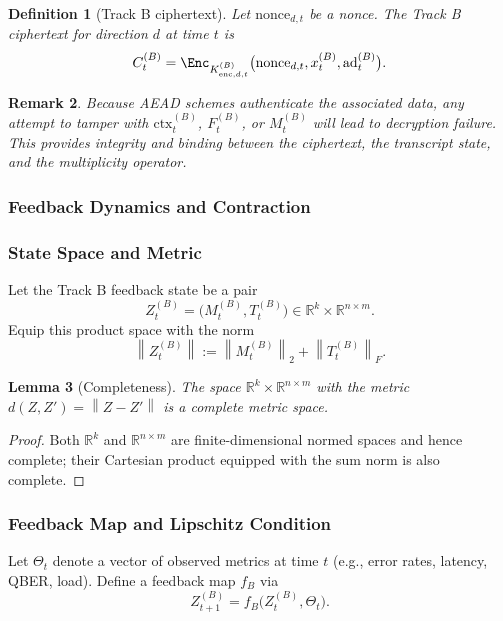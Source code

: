 \documentclass[11pt]{article}
\newtheorem{definition}{Definition}[section]
\newtheorem{remark}[definition]{Remark}
\newtheorem{lemma}[definition]{Lemma}
\newcommand{\R}{\mathbb{R}}
\newcommand{\norm}[1]{\left\lVert #1 \right\rVert}
\begin{document}
\begin{definition}[Track B ciphertext]
Let \(\mathrm{nonce}_{d,t}\) be a nonce.
The Track B ciphertext for direction \(d\) at time \(t\) is
\[
  C_t^{(B)} = \Enc_{K_{\mathrm{enc},d,t}^{(B)}}\bigl(\mathrm{nonce}_{d,t}, x_t^{(B)}, \mathrm{ad}_t^{(B)}\bigr).
\]
\end{definition}

\begin{remark}
Because AEAD schemes authenticate the associated data, any attempt to tamper with \(\mathrm{ctx}_t^{(B)}\), \(F_t^{(B)}\), or \(M_t^{(B)}\) will lead to decryption failure.
This provides integrity and binding between the ciphertext, the transcript state, and the multiplicity operator.
\end{remark}

\subsubsection{Feedback Dynamics and Contraction}

\subsubsection{State Space and Metric}

Let the Track B feedback state be a pair
\[
  Z_t^{(B)} = \bigl(M_t^{(B)}, T_t^{(B)}\bigr) \in \R^k \times \R^{n \times m}.
\]
Equip this product space with the norm
\[
  \norm{Z_t^{(B)}} := \norm{M_t^{(B)}}_2 + \norm{T_t^{(B)}}_F.
\]

\begin{lemma}[Completeness]
The space \(\R^k \times \R^{n \times m}\) with the metric \(d(Z,Z') = \norm{Z-Z'}\) is a complete metric space.
\end{lemma}

\begin{proof}
Both \(\R^k\) and \(\R^{n \times m}\) are finite-dimensional normed spaces and hence complete; their Cartesian product equipped with the sum norm is also complete.
\end{proof}

\subsubsection{Feedback Map and Lipschitz Condition}

Let \(\Theta_t\) denote a vector of observed metrics at time \(t\) (e.g., error rates, latency, QBER, load).
Define a feedback map \(f_B\) via
\[
  Z_{t+1}^{(B)} = f_B\bigl(Z_t^{(B)}, \Theta_t\bigr).
\]
\end{document}

